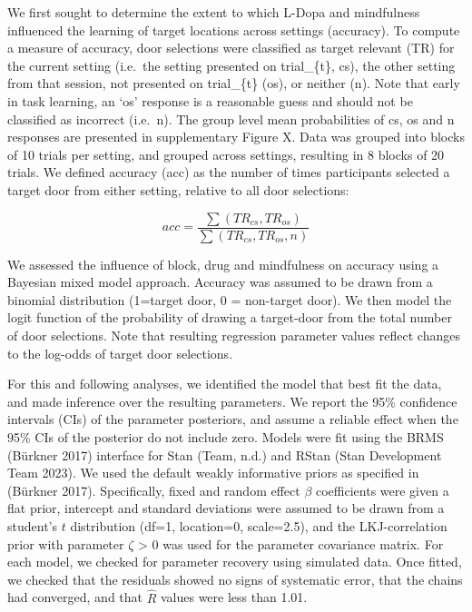 \documentclass{article}
\begin{document}
We first sought to determine the extent to which L-Dopa and mindfulness
influenced the learning of target locations across settings (accuracy).
To compute a measure of accuracy, door selections were classified as
target relevant (TR) for the current setting (i.e.~the setting presented
on trial\_\{t\}, cs), the other setting from that session, not presented
on trial\_\{t\} (os), or neither (n). Note that early in task learning,
an `os' response is a reasonable guess and should not be classified as
incorrect (i.e.~n). The group level mean probabilities of cs, os and n
responses are presented in supplementary Figure X. Data was grouped into
blocks of 10 trials per setting, and grouped across settings, resulting
in 8 blocks of 20 trials. We defined accuracy (acc) as the number of
times participants selected a target door from either setting, relative
to all door selections:

\[
acc = \frac{\sum{(TR_{cs}, TR_{os})}}{\sum{(TR_{cs}, TR_{os}, n)}}
\]

We assessed the influence of block, drug and mindfulness on accuracy
using a Bayesian mixed model approach. Accuracy was assumed to be drawn
from a binomial distribution (1=target door, 0 = non-target door). We
then model the logit function of the probability of drawing a
target-door from the total number of door selections. Note that
resulting regression parameter values reflect changes to the log-odds of
target door selections.

For this and following analyses, we identified the model that best fit
the data, and made inference over the resulting parameters. We report
the 95\% confidence intervals (CIs) of the parameter posteriors, and
assume a reliable effect when the 95\% CIs of the posterior do not
include zero. Models were fit using the BRMS (Bürkner 2017) interface
for Stan (Team, n.d.) and RStan (Stan Development Team 2023). We used
the default weakly informative priors as specified in (Bürkner 2017).
Specifically, fixed and random effect \(\beta\) coefficients were given
a flat prior, intercept and standard deviations were assumed to be drawn
from a student's \(t\) distribution (df=1, location=0, scale=2.5), and
the LKJ-correlation prior with parameter \(\zeta\) \textgreater{} 0 was
used for the parameter covariance matrix. For each model, we checked for
parameter recovery using simulated data. Once fitted, we checked that
the residuals showed no signs of systematic error, that the chains had
converged, and that \(\hat{R}\) values were less than 1.01.
\end{document}
